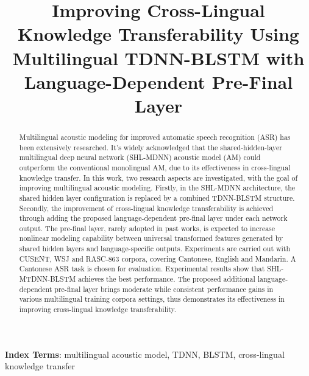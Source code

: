 \documentclass[a4paper]{article}
\title{Improving Cross-Lingual Knowledge Transferability Using Multilingual TDNN-BLSTM with Language-Dependent Pre-Final Layer}
\begin{document}
\maketitle
%
\begin{abstract}
Multilingual acoustic modeling for improved automatic speech recognition (ASR) has been extensively researched. It's widely acknowledged that the shared-hidden-layer multilingual deep neural network (SHL-MDNN) acoustic model (AM) could outperform the conventional monolingual AM, due to its effectiveness in cross-lingual knowledge transfer. In this work, two research aspects are investigated, with the goal of improving multilingual acoustic modeling. Firstly, in the  SHL-MDNN architecture, the shared hidden layer configuration is replaced by a combined TDNN-BLSTM structure. Secondly, the improvement of cross-lingual knowledge transferability is achieved through adding the proposed language-dependent pre-final layer under each network output. The pre-final layer, rarely adopted in past works, is expected to increase nonlinear modeling capability between universal transformed features generated by shared hidden layers and language-specific outputs. Experiments are carried out with CUSENT, WSJ and RASC-863 corpora, covering Cantonese, English and Mandarin. A Cantonese ASR task is chosen for evaluation. Experimental results show that SHL-MTDNN-BLSTM achieves the best performance. The proposed additional language-dependent pre-final layer brings moderate while consistent performance gains in various multilingual training corpora settings, thus demonstrates its effectiveness in improving cross-lingual knowledge transferability.


\end{abstract}
\noindent\textbf{Index Terms}: multilingual acoustic model, TDNN, BLSTM, cross-lingual knowledge transfer
\end{document}
